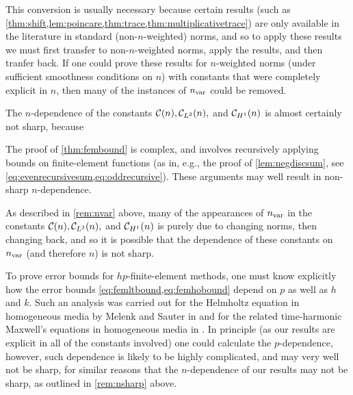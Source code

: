 This conversion is usually necessary because certain results (such as \cref{thm:shift,lem:poincare,thm:trace,thm:multiplicativetrace}) are only available in the literature in standard (non-$n$-weighted) norms, and so to apply these results we must first transfer to non-$n$-weighted norms, apply the results, and then tranfer back. If one could prove these results for $n$-weighted norms (under sufficient smoothness conditions on $n$) with constants that were completely explicit in $n$, then many of the instances of $n_{\mathrm{var}}$ could be removed.
\ere

\label{rem:nsharp}
The $n$-dependence of the constants $\mathcal C(n), \mathcal C_{L^{2}}(n),$ and $\mathcal C_{H^{1}}(n)$ is almost certainly not sharp, because
\ben
\item The proof of \cref{thm:fembound} is complex, and involves recursively applying bounds on finite-element functions (as in, e.g., the proof of \cref{lem:negdiscsum}, see \cref{eq:evenrecursivesum,eq:oddrecursive}). These arguments may well result in non-sharp $n$-dependence.
  \item As described in \cref{rem:nvar} above, many of the appearances of $n_{\mathrm{var}}$ in the constants $\mathcal C(n), \mathcal C_{L^{2}}(n),$ and $\mathcal C_{H^{1}}(n)$ is purely due to changing norms, then changing back, and so it is possible that the dependence of these constants on $n_{\mathrm{var}}$ (and therefore $n$) is not sharp.
\een
\ere

\bre[$p$-dependence]
To prove error bounds for $hp$-finite-element methods, one must know explicitly how the error bounds \cref{eq:femltbound,eq:femhobound} depend on $p$ as well as $h$ and $k$. Such an analysis was carried out for the Helmholtz equation in homogeneous media by Melenk and Sauter in \cite{MeSa:10,MeSa:11} and for the related time-harmonic Maxwell's equations in homogeneous media in \cite{MeSa:18}. In principle (as our results are explicit in all of the constants involved) one could calculate the $p$-dependence, however, such dependence is likely to be highly complicated, and may very well not be sharp, for similar reasons that the $n$-dependence of our results may not be sharp, as outlined in \cref{rem:nsharp} above.
\ere

